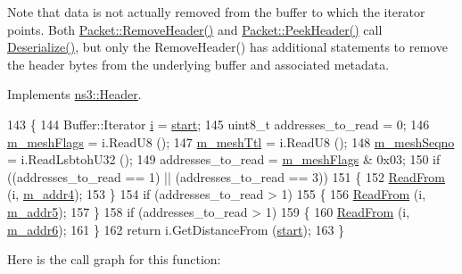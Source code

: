 Note that data is not actually removed from the buffer to which the iterator points. Both \hyperlink{classns3_1_1Packet_a0961eccf975d75f902d40956c93ba63e}{Packet\+::\+Remove\+Header()} and \hyperlink{classns3_1_1Packet_aadc63487bea70945c418f4c3e9b81964}{Packet\+::\+Peek\+Header()} call \hyperlink{classns3_1_1dot11s_1_1MeshHeader_ae1d5bb8426d5bb59885db11f699f436c}{Deserialize()}, but only the Remove\+Header() has additional statements to remove the header bytes from the underlying buffer and associated metadata. 

Implements \hyperlink{classns3_1_1Header_a78be9400bb66b2a8543606f395ef5396}{ns3\+::\+Header}.


\begin{DoxyCode}
143 \{
144   Buffer::Iterator \hyperlink{bernuolliDistribution_8m_a6f6ccfcf58b31cb6412107d9d5281426}{i} = \hyperlink{namespacevisualizer_1_1core_a2a35e5d8a34af358b508dac8635754e0}{start};
145   uint8\_t addresses\_to\_read = 0;
146   \hyperlink{classns3_1_1dot11s_1_1MeshHeader_a6cb6a7dd16beef2e5cf113df85690cf0}{m\_meshFlags} = i.ReadU8 ();
147   \hyperlink{classns3_1_1dot11s_1_1MeshHeader_ad1e601e495f9e0893c5d2798752b159a}{m\_meshTtl} = i.ReadU8 ();
148   \hyperlink{classns3_1_1dot11s_1_1MeshHeader_af42c8d6c650c246d37c13985641b0776}{m\_meshSeqno} = i.ReadLsbtohU32 ();
149   addresses\_to\_read = \hyperlink{classns3_1_1dot11s_1_1MeshHeader_a6cb6a7dd16beef2e5cf113df85690cf0}{m\_meshFlags} & 0x03;
150   \textcolor{keywordflow}{if} ((addresses\_to\_read == 1) || (addresses\_to\_read == 3))
151     \{
152       \hyperlink{namespacens3_aeeba9f1570f031f9e401f76f51943805}{ReadFrom} (i, \hyperlink{classns3_1_1dot11s_1_1MeshHeader_a4d62d6b97bff6136314833200b747e17}{m\_addr4});
153     \}
154   \textcolor{keywordflow}{if} (addresses\_to\_read > 1)
155     \{
156       \hyperlink{namespacens3_aeeba9f1570f031f9e401f76f51943805}{ReadFrom} (i, \hyperlink{classns3_1_1dot11s_1_1MeshHeader_aec4f70b8a26d0134c5b1239a88d0f542}{m\_addr5});
157     \}
158   \textcolor{keywordflow}{if} (addresses\_to\_read > 1)
159     \{
160       \hyperlink{namespacens3_aeeba9f1570f031f9e401f76f51943805}{ReadFrom} (i, \hyperlink{classns3_1_1dot11s_1_1MeshHeader_a339b9fe0435cd04b204400e933d56fcc}{m\_addr6});
161     \}
162   \textcolor{keywordflow}{return} i.GetDistanceFrom (\hyperlink{namespacevisualizer_1_1core_a2a35e5d8a34af358b508dac8635754e0}{start});
163 \}
\end{DoxyCode}


Here is the call graph for this function\+:


